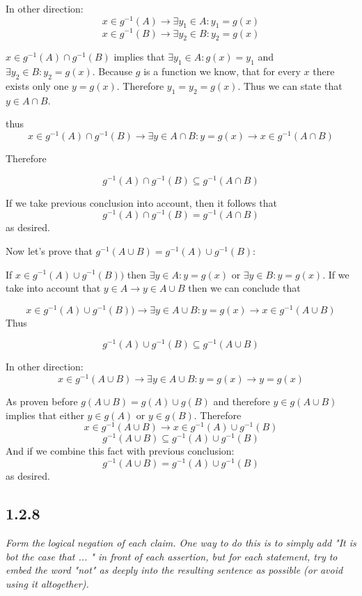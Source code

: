 \documentclass[11pt,oneside,titlepage]{book}
\begin{document}
In other direction: 
$$x \in g^{-1}(A) \to \exists y_1 \in A: y_1 = g(x)$$
$$x \in g^{-1}(B) \to \exists y_2 \in B: y_2 = g(x)$$

$x \in g^{-1}(A) \cap g^{-1}(B)$ implies that $ \exists y_1 \in
A: g(x) = y_1$ and $\exists y_2 \in B: y_2 = g(x)$.
Because $g$ is a function we know, that
for every $x$ there exists only one $y = g(x)$. Therefore $y_1 = y_2 = g(x)$.
Thus we can state that $y \in A \cap B$.

thus
$$x \in g^{-1}(A) \cap g^{-1}(B) \to \exists y \in A \cap B: y = g(x) \to
x \in g^{-1}(A \cap B)$$

Therefore 

$$ g^{-1}(A) \cap g^{-1}(B) \subseteq   g^{-1}(A \cap B)$$

If we take previous conclusion into account, then it follows that
$$ g^{-1}(A) \cap g^{-1}(B) = g^{-1}(A \cap B)$$
as desired.

Now let's prove that  $g^{-1}(A \cup B) = g^{-1}(A) \cup g^{-1}(B)$:


If $ x \in g^{-1}(A) \cup g^{-1}(B))$ then  $\exists y \in A: y = g(x)$ or
$\exists y \in B: y = g(x)$. If we take into account that
$y \in A \to y \in A \cup B$ then we can conclude that

$$ x \in g^{-1}(A) \cup g^{-1}(B)) \to \exists y \in A \cup B : y = g(x) \to
x \in g^{-1}(A \cup B)$$
Thus

$$g^{-1}(A) \cup g^{-1}(B) \subseteq g^{-1}(A \cup B)$$

In other direction: 
$$x \in g^{-1}(A \cup B) \to \exists y \in A \cup B: y = g(x) \to y = g(x)$$

As proven before $g(A \cup B) = g(A) \cup g(B)$ and therefore
$y \in g(A \cup B)$ implies that either $y \in g(A)$ or $y \in g(B)$. Therefore
$$ x \in g^{-1}(A \cup B) \to x \in g^{-1}(A) \cup g^{-1}(B)$$
$$ g^{-1}(A \cup B)  \subseteq g^{-1}(A) \cup g^{-1}(B)$$
And if we combine this fact with previous conclusion:
$$ g^{-1}(A \cup B) =  g^{-1}(A) \cup g^{-1}(B)$$
as desired.

\subsection*{1.2.8}

\textit{Form the logical negation of each claim. One way to do this is to
  simply add "It is bot the case that ... " in front of each assertion, but for
  each statement, try to embed the word "not" as deeply into the resulting
  sentence as possible (or avoid using it altogether).}
\end{document}
